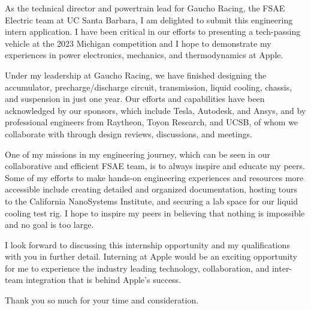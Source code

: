 \documentclass[11pt, letterpaper]{awesome-cv} %
\begin{document}
\makecvheader %

\makelettertitle %


\begin{cvletter}

As the technical director and powertrain lead for Gaucho Racing, the FSAE Electric team at UC Santa Barbara, I am delighted to submit this engineering intern application. I have been critical in our efforts to presenting a tech-passing vehicle at the 2023 Michigan competition and I hope to demonstrate my experiences in power electronics, mechanics, and thermodynamics at Apple. 

Under my leadership at Gaucho Racing, we have finished designing the accumulator, precharge/discharge circuit, transmission, liquid cooling, chassis, and suspension in just one year. Our efforts and capabilities have been acknowledged by our sponsors, which include Tesla, Autodesk, and Ansys, and by professional engineers from Raytheon, Toyon Research, and UCSB, of whom we collaborate with through design reviews, discussions, and meetings. 

One of my missions in my engineering journey, which can be seen in our collaborative and efficient FSAE team, is to always inspire and educate my peers. Some of my efforts to make hands-on engineering experiences and resources more accessible include creating detailed and organized documentation, hosting tours to the California NanoSystems Institute, and securing a lab space for our liquid cooling test rig. I hope to inspire my peers in believing that nothing is impossible and no goal is too large.

I look forward to discussing this internship opportunity and my qualifications with you in further detail. Interning at Apple would be an exciting opportunity for me to experience the industry leading technology, collaboration, and inter-team integration that is behind Apple's success. 

Thank you so much for your time and consideration.



\end{cvletter}


\makeletterclosing %
\end{document}
